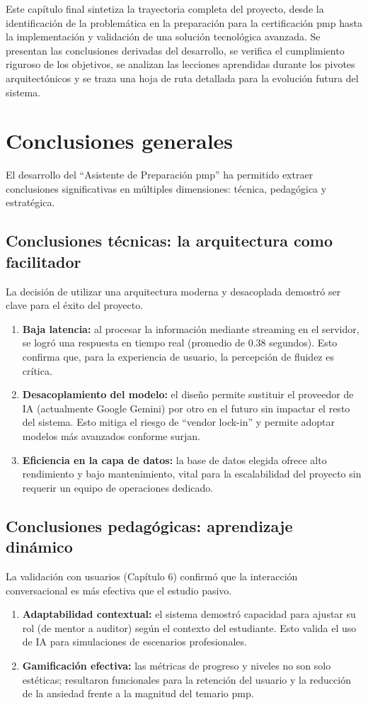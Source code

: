 Este capítulo final sintetiza la trayectoria completa del proyecto, desde la identificación de la problemática en la preparación para la certificación \gls{pmp} hasta la implementación y validación de una solución tecnológica avanzada. Se presentan las conclusiones derivadas del desarrollo, se verifica el cumplimiento riguroso de los objetivos, se analizan las lecciones aprendidas durante los pivotes arquitectónicos y se traza una hoja de ruta detallada para la evolución futura del sistema.

\section{Conclusiones generales}

El desarrollo del \enquote{Asistente de Preparación \gls{pmp}} ha permitido extraer conclusiones significativas en múltiples dimensiones: técnica, pedagógica y estratégica.

\subsection{Conclusiones técnicas: la arquitectura como facilitador}
La decisión de utilizar una arquitectura moderna y desacoplada demostró ser clave para el éxito del proyecto.
\begin{enumerate}
\item \textbf{Baja latencia:} al procesar la información mediante streaming en el servidor, se logró una respuesta en tiempo real (promedio de 0.38 segundos). Esto confirma que, para la experiencia de usuario, la percepción de fluidez es crítica.
\item \textbf{Desacoplamiento del modelo:} el diseño permite sustituir el proveedor de IA (actualmente Google Gemini) por otro en el futuro sin impactar el resto del sistema. Esto mitiga el riesgo de \enquote{vendor lock-in} y permite adoptar modelos más avanzados conforme surjan.
\item \textbf{Eficiencia en la capa de datos:} la base de datos elegida ofrece alto rendimiento y bajo mantenimiento, vital para la escalabilidad del proyecto sin requerir un equipo de operaciones dedicado.
\end{enumerate}

\subsection{Conclusiones pedagógicas: aprendizaje dinámico}
La validación con usuarios (Capítulo 6) confirmó que la interacción conversacional es más efectiva que el estudio pasivo.
\begin{enumerate}
\item \textbf{Adaptabilidad contextual:} el sistema demostró capacidad para ajustar su rol (de mentor a auditor) según el contexto del estudiante. Esto valida el uso de IA para simulaciones de escenarios profesionales.
\item \textbf{Gamificación efectiva:} las métricas de progreso y niveles no son solo estéticas; resultaron funcionales para la retención del usuario y la reducción de la ansiedad frente a la magnitud del temario \gls{pmp}.
\end{enumerate}

